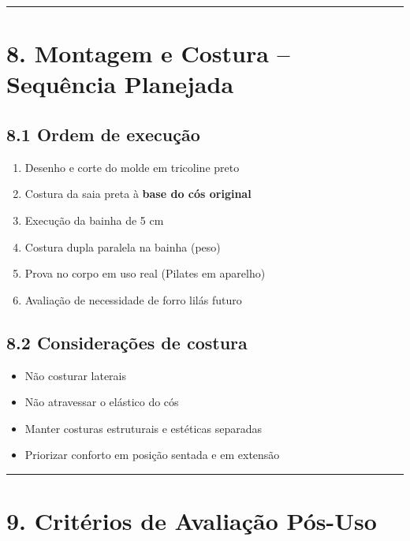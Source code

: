 \documentclass[
  10pt,oneside]{article}
\providecommand{\tightlist}{%
  \setlength{\itemsep}{0pt}\setlength{\parskip}{0pt}}
\begin{document}
\begin{center}\rule{0.5\linewidth}{0.5pt}\end{center}

\section{8. Montagem e Costura -- Sequência Planejada}\label{montagem-e-costura-sequuxeancia-planejada}

\subsection{8.1 Ordem de execução}\label{ordem-de-execuuxe7uxe3o}

\begin{enumerate}
\def\labelenumi{\arabic{enumi}.}
\tightlist
\item
  Desenho e corte do molde em tricoline preto
\item
  Costura da saia preta à \textbf{base do cós original}
\item
  Execução da bainha de 5 cm
\item
  Costura dupla paralela na bainha (peso)
\item
  Prova no corpo em uso real (Pilates em aparelho)
\item
  Avaliação de necessidade de forro lilás futuro
\end{enumerate}

\subsection{8.2 Considerações de costura}\label{considerauxe7uxf5es-de-costura}

\begin{itemize}
\tightlist
\item
  Não costurar laterais
\item
  Não atravessar o elástico do cós
\item
  Manter costuras estruturais e estéticas separadas
\item
  Priorizar conforto em posição sentada e em extensão
\end{itemize}

\begin{center}\rule{0.5\linewidth}{0.5pt}\end{center}

\section{9. Critérios de Avaliação Pós-Uso}\label{crituxe9rios-de-avaliauxe7uxe3o-puxf3s-uso}
\end{document}
